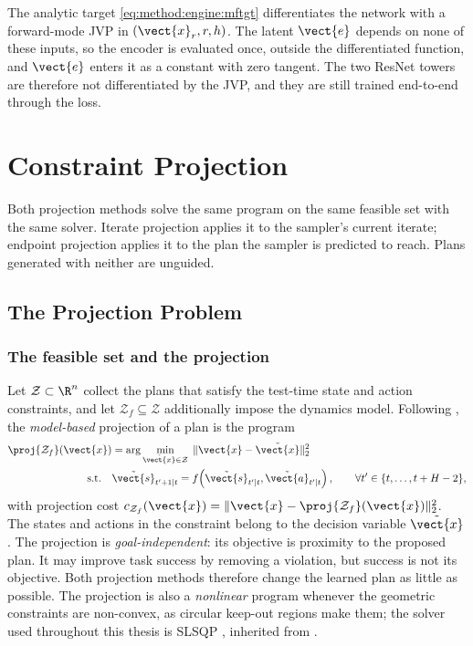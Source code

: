 The analytic target \eqref{eq:method:engine:mftgt} differentiates the network with a forward-mode
\ac{JVP} in $(\vect{x}_{r},r,h)$. The latent $\vect{e}$ depends on none of these inputs, so the encoder
is evaluated once, outside the differentiated function, and $\vect{e}$ enters it as a constant with
zero tangent. The two ResNet towers are therefore not differentiated by the \ac{JVP}, and they are
still trained end-to-end through the loss.

\section{Constraint Projection}\label{sec:method:projection}

Both projection methods solve the same program on the same feasible set with the same solver. Iterate
projection applies it to the sampler's current iterate; endpoint projection applies it to the plan the
sampler is predicted to reach. Plans generated with neither are unguided.

\subsection{The Projection Problem}\label{sec:method:proj}

\subsubsection*{The feasible set and the projection}

Let $\mathcal{Z} \subset \R^{n}$ collect the plans that satisfy the test-time state and action
constraints, and let $\mathcal{Z}_{f} \subseteq \mathcal{Z}$ additionally impose the dynamics
model. Following \parencite[Eq.~(9)]{romer2025diffusion}, the \emph{model-based} projection of a plan is the
program
\begin{align}
  \proj{\mathcal{Z}_{f}}(\vect{x})
    &= \arg\min_{\tilde{\vect{x}}\in\mathcal{Z}} \;\|\vect{x}-\tilde{\vect{x}}\|_{2}^{2}
    \label{eq:bg:mpc:proj} \\
  \text{s.t.}\quad & \tilde{\vect{s}}_{t'+1|t}
    = f\!\left(\tilde{\vect{s}}_{t'|t},\tilde{\vect{a}}_{t'|t}\right),
    \qquad \forall t' \in \{t,\dots,t+H-2\},
    \label{eq:bg:mpc:dyn}
\end{align}
with projection cost $c_{\mathcal{Z}_{f}}(\vect{x}) = \|\vect{x}-\proj{\mathcal{Z}_{f}}(\vect{x})\|_{2}^{2}$.
The states and actions in the constraint belong to the decision variable $\tilde{\vect{x}}$.
The projection is \emph{goal-independent}: its objective is proximity to the proposed plan.
It may improve task success by removing a violation, but success is not its objective. Both projection methods therefore
change the learned plan as little as possible. The projection is
also a \emph{nonlinear} program whenever the geometric
constraints are non-convex, as circular keep-out regions make them; the solver used throughout
this thesis is \ac{SLSQP}
\parencite{kraft1988software,virtanen2020scipy}, inherited from \parencite{romer2025diffusion}.

